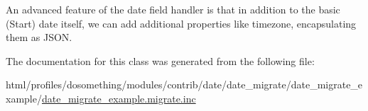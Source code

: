 An advanced feature of the date field handler is that in addition to the basic (Start) date itself, we can add additional properties like timezone, encapsulating them as JSON. 

The documentation for this class was generated from the following file:\begin{DoxyCompactItemize}
\item 
html/profiles/dosomething/modules/contrib/date/date\_\-migrate/date\_\-migrate\_\-example/\hyperlink{date__migrate__example_8migrate_8inc}{date\_\-migrate\_\-example.migrate.inc}\end{DoxyCompactItemize}
